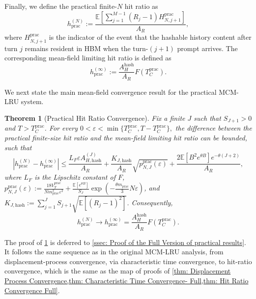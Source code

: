 \documentclass{article}
\newtheorem{theorem}{Theorem}[section]
\theoremstyle{definition}
\newcommand{\E}{\mathbb E}
\begin{document}
Finally, we define the practical finite-$N$ hit ratio as
\begin{equation}
\label{equ: practical finite N hit ratio}
    h_{ \mathrm{prac}}^{(N)}:=\frac{\E\left[\sum_{j=1}^{M-1}(R_j-1)H_{N,j+1}^{\mathrm{prac}}\right]}{A_R},
\end{equation}
where $H_{N,j+1}^{\mathrm{prac}}$ is the indicator of the event that the hashable history content after turn $j$ remains resident in HBM when the turn-$(j+1)$ prompt arrives. The corresponding mean-field limiting hit ratio is defined as
\begin{equation}
\label{equ: practical limiting hit ratio}
    h_{ \mathrm{prac}}^{(\infty)}:=\frac{A_H^{\mathrm{hash}}}{A_R}F(T_C^{\mathrm{prac}}).
\end{equation}


We next state the main mean-field convergence result for the practical MCM-LRU system.

\begin{theorem}[Practical Hit Ratio Convergence]
\label{thm: Practical Hit Ratio Convergence Full}
    Fix a finite $J$ such that $S_{J+1}>0$ and $T>T_C^{\mathrm{prac}}$. For every $0<\varepsilon<\min\{T_C^{\mathrm{prac}},T-T_C^{\mathrm{prac}}\},$ the difference between the practical finite-size hit ratio and the mean-field limiting hit ratio can be bounded, such that
    \begin{equation}
    \label{equ: practical finite N hit ratio bound}
        \left|h_{ \mathrm{prac}}^{(N)}-h_{ \mathrm{prac}}^{(\infty)}\right| \leq \frac{L_F\varepsilon A_{H,\mathrm{hash}}^{(J)}}{A_R} + \frac{K_{J,\mathrm{hash}}}{A_R}\sqrt{p_{N,J}^{\mathrm{prac}}(\varepsilon)} + \frac{2\E[B^2e^{\theta B}]e^{-\theta(J+2)}}{A_R},
    \end{equation}
    where $L_F$ is the Lipschitz constant of $F$, $p_{N,J}^{\mathrm{prac}}(\varepsilon) :=\frac{18V_T^{\mathrm{prac}}}{Nm_{\mathrm{prac}}^2\varepsilon^2} + \frac{\E[e^{\theta B}]}{S_J} \exp\left(-\frac{\theta m_{\mathrm{prac}}}{3}N\varepsilon\right)$, and $ K_{J,\mathrm{hash}}:=\sum_{j=1}^{J}S_{j+1}\sqrt{\E[(R_j-1)^2]}$.  Consequently,
    \begin{equation}
    \label{equ: practical hit ratio convergence full}
        h_{ \mathrm{prac}}^{(N)}\rightarrow h_{ \mathrm{prac}}^{(\infty)}= \frac{A_H^{\mathrm{hash}}}{A_R} F(T_C^{\mathrm{prac}}).
    \end{equation}
\end{theorem}

The proof of \cref{thm: Practical Hit Ratio Convergence Full} is deferred to \cref{ssec: Proof of the Full Version of practical results}. It follows the same sequence as in the original MCM-LRU analysis, from displacement-process convergence, via characteristic time convergence, to hit-ratio convergence, which is the same as the map of proofs of \cref{thm: Displacement Process Convergence,thm: Characteristic Time Convergence- Full,thm: Hit Ratio Convergence Full}.
\end{document}
